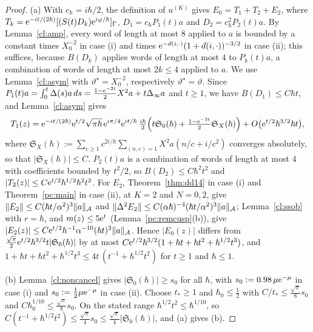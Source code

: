 \begin{proof}
(a) With $c_\hbar=i\hbar/2$, the definition of $u^{(K)}$ gives $E_0=T_1+T_2+E_2$, where
$T_k=\mathrm{e}^{-it/(2\hbar)}[(S(t)D_k)\mathrm{e}^{i\varphi/\hbar}]_\Gamma$, $D_1=c_\hbar P_1(t)a$ and $D_2=c_\hbar^2P_2(t)a$. By Lemma~\ref{cl:amp}, every word
of length at most $8$ applied to $a$ is bounded by a constant times $X_0^{-2}$ in case (i) and times $\mathrm{e}^{-d(i,\cdot)}(1+d(i,\cdot))^{-3/2}$ in
case (ii); this suffices, because $B(D_k)$ applies words of length at most $4$ to $P_k(t)a$, a combination of words of length
at most $2k\le4$ applied to $a$. We use Lemma~\ref{cl:asym} with $\vartheta^\star=X_0^{-2}$, respectively $\vartheta^\star=\vartheta$. Since
$P_1(t)a=\int_0^t\Delta(s)a\,ds=\tfrac{1-\mathrm{e}^{-2t}}2X^2a+t\Delta_\infty a$ and $t\ge1$, we have $B(D_1)\le C\hbar t$, and Lemma~\ref{cl:asym} gives
\[
T_1(z)=\mathrm{e}^{-it/(2\hbar)}\mathrm{e}^{t/2}\sqrt{\pi\hbar}\,\mathrm{e}^{i\pi/4}\mathrm{e}^{it/\hbar}\,\tfrac{i\hbar}2\Bigl(t\mathfrak S_0(\hbar)+\tfrac{1-\mathrm{e}^{-2t}}2\mathfrak S_X(\hbar)\Bigr)
+O\bigl(\mathrm{e}^{t/2}\hbar^{3/2}\hbar t\bigr),
\]
where $\mathfrak S_X(\hbar):=\sum_{c\ge1}c^{2i/\hbar}\sum_{(n,c)=1}X^2a(n/c+i/c^2)$ converges absolutely, so that $|\mathfrak S_X(\hbar)|\le C$. $P_2(t)a$ is a
combination of words of length at most $4$ with coefficients bounded by $t^2/2$, so $B(D_2)\le C\hbar^2t^2$ and
$|T_2(z)|\le C\mathrm{e}^{t/2}\hbar^{1/2}\hbar^2t^2$. For $E_2$, Theorem~\ref{thm:dd14} in case (i)
and Theorem~\ref{pc:main} in case (ii), at $K=2$ and $N=0,2$, give $\lVert E_2\rVert\le C(\hbar t/\alpha^2)^3\lVert a\rVert_{\mathcal A}$ and
$\lVert \Delta^2E_2\rVert\le C(\alpha\hbar)^{-4}(\hbar t/\alpha^2)^3\lVert a\rVert_{\mathcal A}$; Lemma~\ref{cl:ssob} with $r=\hbar$, and $m(z)\le5\mathrm{e}^t$
(Lemma~\ref{pc:remcusp}(b)), give
$|E_2(z)|\le C\mathrm{e}^{t/2}\hbar^{-1}\alpha^{-10}(\hbar t)^3\lVert a\rVert_{\mathcal A}$. Hence $|E_0(z)|$ differs from
$\tfrac{\sqrt\pi}2\mathrm{e}^{t/2}\hbar^{3/2}t|\mathfrak S_0(\hbar)|$ by at most $C\mathrm{e}^{t/2}\hbar^{3/2}(1+\hbar t+\hbar t^2+\hbar^{1/2}t^3)$, and
$1+\hbar t+\hbar t^2+\hbar^{1/2}t^3\le4t\,(t^{-1}+\hbar^{1/2}t^2)$ for $t\ge1$ and $\hbar\le1$.

(b) Lemma~\ref{cl:noncancel} gives $|\mathfrak S_0(\hbar)|\ge s_0$ for all $\hbar$, with $s_0:=0.98\,\mu\mathrm{e}^{-\mu}$ in case (i) and
$s_0:=\tfrac12\mu\mathrm{e}^{-\mu}$ in case (ii). Choose $t_*\ge1$ and $\hbar_0\le\tfrac12$ with $C/t_*\le\tfrac{\sqrt\pi}8s_0$ and
$C\hbar_0^{1/10}\le\tfrac{\sqrt\pi}8s_0$. On the stated range $\hbar^{1/2}t^2\le\hbar^{1/10}$, so
$C(t^{-1}+\hbar^{1/2}t^2)\le\tfrac{\sqrt\pi}4s_0\le\tfrac{\sqrt\pi}4|\mathfrak S_0(\hbar)|$, and (a) gives (b).
\end{proof}

